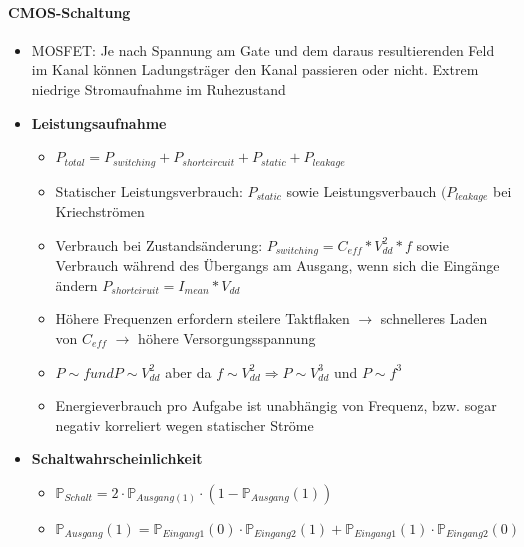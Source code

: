 	\paragraph{CMOS-Schaltung}
		\begin{itemize}
			\item MOSFET: Je nach Spannung am Gate und dem daraus resultierenden Feld im Kanal können Ladungsträger den Kanal passieren oder nicht. Extrem niedrige Stromaufnahme im Ruhezustand
			\item \textbf{Leistungsaufnahme}
			\begin{itemize}
				\item \(P_{total} = P_{switching} + P_{shortcircuit} + P_{static} + P_{leakage}\)
				\item Statischer Leistungsverbrauch: \(P_{static}\) sowie Leistungsverbauch $(P_{leakage}$ bei Kriechströmen
				\item Verbrauch bei Zustandsänderung: \(P_{switching}=C_{eff}*V_{dd}^2*f\) sowie Verbrauch während des Übergangs am Ausgang, wenn sich die Eingänge ändern \(P_{shortciruit}=I_{mean}*V_{dd}\) 
				\item Höhere Frequenzen erfordern steilere Taktflaken \(\rightarrow\) schnelleres Laden von \(C_{eff}\) \(\rightarrow\) höhere Versorgungsspannung 
				\item \(P \sim f und P \sim V_{dd}^2\) aber da $f \sim V_{dd}^2 \Rightarrow P \sim V_{dd}^3 $ und $P \sim f^3$
				\item Energieverbrauch pro Aufgabe ist unabhängig von Frequenz, bzw. sogar negativ korreliert wegen statischer Ströme		
			\end{itemize}
			\item \textbf{Schaltwahrscheinlichkeit}
			\begin{itemize}
				\item \(\mathbb{P}_{Schalt} = 2 \cdot \mathbb{P}_{Ausgang(1)} \cdot (1-\mathbb{P}_{Ausgang}(1))\)
				\item \(\mathbb{P}_{Ausgang}(1) = \mathbb{P}_{Eingang1}(0) \cdot \mathbb{P}_{Eingang2}(1) + \mathbb{P}_{Eingang1}(1) \cdot \mathbb{P}_{Eingang2}(0)\)
			\end{itemize}
	\end{itemize}

